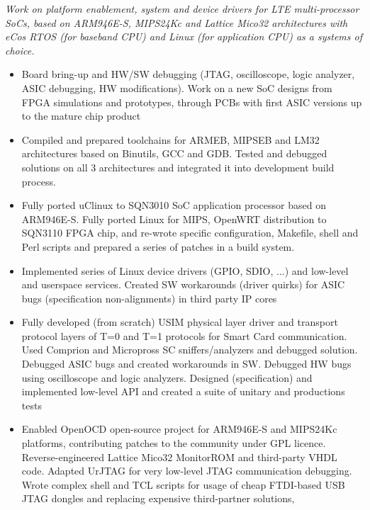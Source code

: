 \documentclass[a4paper, oneside, final]{scrartcl}
\begin{document}
   \textit{Work on platform enablement, system and device drivers for LTE
   multi-processor SoCs, based on ARM946E-S, MIPS24Kc and Lattice Mico32
   architectures with eCos RTOS (for baseband CPU) and Linux (for application CPU)
   as a systems of choice.}

\begin{itemize}
   \item Board bring-up and HW/SW debugging (JTAG, oscilloscope,
         logic analyzer, ASIC debugging, HW modifications). Work on a new SoC
         designs from FPGA simulations and prototypes, through PCBs with first ASIC versions up
         to the mature chip product
   \item Compiled and prepared toolchains for ARMEB, MIPSEB and LM32
            architectures based on Binutils, GCC and GDB.
            Tested and debugged solutions on all 3 architectures and integrated
            it into development build process.
   \item Fully ported uClinux to SQN3010 SoC application processor based on
            ARM946E-S. Fully ported Linux for MIPS, OpenWRT distribution to SQN3110 FPGA
            chip, and re-wrote specific configuration, Makefile, shell and Perl scripts
            and prepared a series of patches in a build system.
   \item Implemented series of Linux device drivers (GPIO, SDIO, ...) and
            low-level and userspace services. Created SW workarounds (driver
            quirks) for ASIC bugs (specification non-alignments) in third party
            IP cores
   \item Fully developed (from scratch) USIM physical layer driver and
            transport protocol layers of T=0 and T=1 protocols for Smart Card
            communication. Used Comprion and Micropross SC sniffers/analyzers
            and debugged solution. Debugged ASIC bugs and created workarounds
            in SW. Debugged HW bugs using oscilloscope and logic analyzers. 
            Designed (specification) and implemented low-level API and 
            created a suite of unitary and productions tests
   \item Enabled OpenOCD open-source project for ARM946E-S and MIPS24Kc
            platforms, contributing patches to the community under GPL
            licence. Reverse-engineered Lattice Mico32 MonitorROM and third-party VHDL code.
            Adapted UrJTAG for very low-level JTAG communication debugging.
            Wrote complex shell and TCL scripts for usage of cheap
            FTDI-based USB JTAG dongles and replacing expensive third-partner solutions,

\end{itemize}
\end{document}
